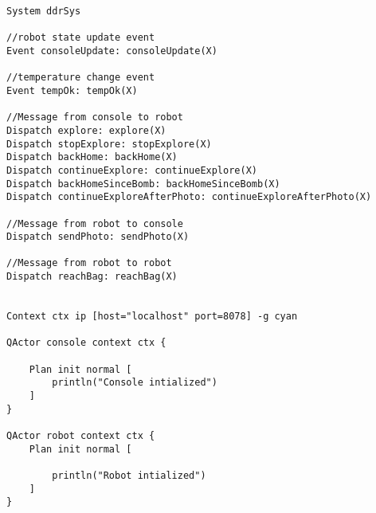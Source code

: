 \begin{lstlisting}
System ddrSys

//robot state update event
Event consoleUpdate: consoleUpdate(X)

//temperature change event
Event tempOk: tempOk(X)

//Message from console to robot
Dispatch explore: explore(X)
Dispatch stopExplore: stopExplore(X)
Dispatch backHome: backHome(X)
Dispatch continueExplore: continueExplore(X)
Dispatch backHomeSinceBomb: backHomeSinceBomb(X)
Dispatch continueExploreAfterPhoto: continueExploreAfterPhoto(X)

//Message from robot to console
Dispatch sendPhoto: sendPhoto(X)

//Message from robot to robot
Dispatch reachBag: reachBag(X)


Context ctx ip [host="localhost" port=8078] -g cyan

QActor console context ctx { 
	
	Plan init normal [
		println("Console intialized")
	]
}

QActor robot context ctx { 
	Plan init normal [
		
		println("Robot intialized")
	]
} 
\end{lstlisting}